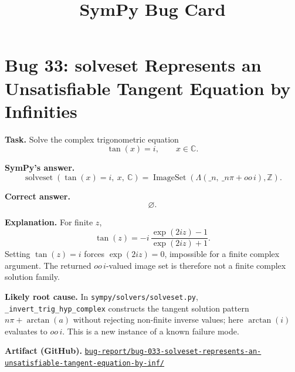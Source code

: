 \documentclass[11pt]{article}
\title{SymPy Bug Card}
\author{}
\date{}
\newcommand{\artifactrepo}{https://github.com/TODO-org/TODO-repo}
\newcommand{\bugbundle}[1]{\href{\artifactrepo/tree/main/bug-report/#1}{\nolinkurl{bug-report/#1/}}}
\begin{document}
\maketitle

\section*{Bug 33: solveset Represents an Unsatisfiable Tangent Equation by Infinities}

\begin{counterexamplebox}
\textbf{Task.} Solve the complex trigonometric equation
\[
\tan(x)=i,\qquad x\in\mathbb{C}.
\]

\medskip
\textbf{SymPy's answer.}
\[
\operatorname{solveset}(\tan(x)=i,\ x,\ \mathbb{C})
= \operatorname{ImageSet}(\Lambda(\_n,\ \_n\pi+oo\,i),\mathbb{Z}).
\]

\medskip
\textbf{Correct answer.}
\[
\varnothing.
\]

\medskip
\textbf{Explanation.} For finite \(z\),
\[
\tan(z)=-i\,\frac{\exp(2iz)-1}{\exp(2iz)+1}.
\]
Setting \(\tan(z)=i\) forces \(\exp(2iz)=0\), impossible for a finite complex
argument. The returned \(oo\,i\)-valued image set is therefore not a finite
complex solution family.

\medskip
\textbf{Likely root cause.} In \nolinkurl{sympy/solvers/solveset.py},
\texttt{\_invert\_trig\_hyp\_complex} constructs the tangent solution pattern
\(n\pi+\arctan(a)\) without rejecting non-finite inverse values; here
\(\arctan(i)\) evaluates to \(oo\,i\). This is a new instance of a known failure
mode.

\medskip
\textbf{Artifact (GitHub).} \bugbundle{bug-033-solveset-represents-an-unsatisfiable-tangent-equation-by-inf}
\end{counterexamplebox}
\end{document}
